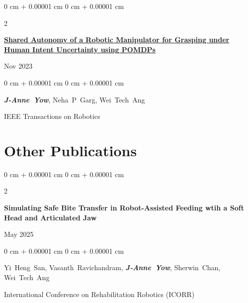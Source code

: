 \documentclass[10pt, letterpaper]{article}
\newenvironment{onecolentry}{
    \begin{adjustwidth}{
        0 cm + 0.00001 cm
    }{
        0 cm + 0.00001 cm
    }
}{
    \end{adjustwidth}
} %
\newenvironment{twocolentry}[2][]{
    \onecolentry
    \def\secondColumn{#2}
    \setcolumnwidth{\fill, 4.5 cm}
    \begin{paracol}{2}
}{
    \switchcolumn \raggedleft \secondColumn
    \end{paracol}
    \endonecolentry
} %
\begin{document}
        \vspace{0.2 cm}

        \begin{samepage}
            \begin{twocolentry}{
                Nov 2023
            }
                \textbf{\href{https://ieeexplore.ieee.org/document/10323205}{Shared Autonomy of a Robotic Manipulator for Grasping under Human Intent Uncertainty using POMDPs}}
            \end{twocolentry}

            \vspace{0.10 cm}
            
            \begin{onecolentry}
                \mbox{\textbf{\textit{J-Anne Yow}}}, \mbox{Neha P Garg}, \mbox{Wei Tech Ang}

                \vspace{0.10 cm}
                
        IEEE Transactions on Robotics\end{onecolentry}
        \end{samepage}


    
    \section{Other Publications}



        
        \begin{samepage}
            \begin{twocolentry}{
                May 2025
            }
                \textbf{Simulating Safe Bite Transfer in Robot-Assisted Feeding wtih a Soft Head and Articulated Jaw}
            \end{twocolentry}

            \vspace{0.10 cm}
            
            \begin{onecolentry}
                \mbox{Yi Heng San}, \mbox{Vasanth Ravichandram}, \mbox{\textbf{\textit{J-Anne Yow}}}, \mbox{Sherwin Chan}, \mbox{Wei Tech Ang}

                \vspace{0.10 cm}
                
        International Conference on Rehabilitation Robotics (ICORR)\end{onecolentry}
        \end{samepage}
\end{document}
